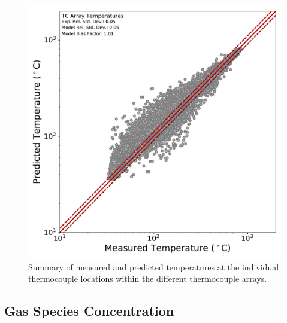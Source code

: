 \begin{figure}[!h]
	\centering
	\includegraphics[width=\columnwidth]{Figures/Plots/Validation/Temperature/loglog_TC_arrays}
	\caption{Summary of measured and predicted temperatures at the individual thermocouple locations within the different thermocouple arrays.}
	\label{fig:loglog_TC_arrays}
\end{figure}

\clearpage
\subsection{Gas Species Concentration}

